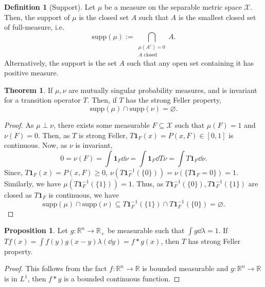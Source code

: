 \documentclass[]{article}
\theoremstyle{definition}
\newtheorem{theorem}{Theorem}
\theoremstyle{definition}
\newtheorem{definition}{Definition}[section]
\newtheorem{proposition}{Proposition}[section]
\begin{document}
\begin{definition}[Support]
  Let \(\mu\) be a measure on the separable metric space \(\mathcal{X}\). Then, 
  the support of \(\mu\) is the closed set \(A\) such that \(A\) is the smallest  
  closed set of full-measure, i.e. 
  \[\text{supp}(\mu) := \bigcap_{\substack{\mu(A^c) = 0\\A \text{ closed}}}A.\]
  Alternatively, the support is the set \(A\) such that any open set containing 
  it has positive measure. 
\end{definition}

\begin{theorem}
  If \(\mu, \nu\) are mutually singular probability measures, and is 
  invariant for a transition operator \(T\). Then, if \(T\) has the strong 
  Feller property, 
  \[\text{supp}(\mu) \cap \text{supp}(\nu) = \varnothing.\]
\end{theorem}
\begin{proof}
  As \(\mu \perp \nu\), there exists some measurable \(F \subseteq \mathcal{X}\) 
  such that \(\mu(F) = 1\) and \(\nu(F) = 0\). Then, as \(T\) is strong Feller, 
  \(T\mathbf{1}_{F}(x) = P(x, F) \in [0, 1]\) is continuous. Now, as \(\nu\) 
  is invariant, 
  \[0 = \nu(F) = \int \mathbf{1}_F \dd \nu = \int \mathbf{1}_F \dd T\nu = 
  \int T\mathbf{1}_F \dd \nu.\]
  Since, \(T\mathbf{1}_{F}(x) = P(x, F) \ge 0\), 
  \(\nu(T\mathbf{1}_F^{-1}(\{0\})) = \nu(\{T\mathbf{1}_F = 0\}) = 1\). Similarly, 
  we have \(\mu(T\mathbf{1}_F^{-1}(\{1\})) = 1\). Thus, as 
  \(T\mathbf{1}_F^{-1}(\{0\}), T\mathbf{1}_F^{-1}(\{1\})\) are closed as 
  \(T\mathbf{1}_F\) is continuous, we have 
  \[\text{supp}(\mu) \cap \text{supp}(\nu) \subseteq 
    T\mathbf{1}_F^{-1}(\{1\}) \cap T\mathbf{1}_F^{-1}(\{0\}) = \varnothing.\]
\end{proof}

\begin{proposition}
  Let \(g : \mathbb{R}^n \to \mathbb{R}_+\) be measurable such that 
  \(\int g \dd \lambda = 1\). If \(Tf(x) = \int f(y)g(x - y) \lambda(\dd y) = f * g(x)\),
  then \(T\) has strong Feller property.
\end{proposition}
\begin{proof}
  This follows from the fact \(f : \mathbb{R}^n \to \mathbb{R}\) is bounded measurable 
  and \(g : \mathbb{R}^n \to \mathbb{R}\) is in \(L^1\), then \(f * g\) is a bounded 
  continuous function. 
\end{proof}
\end{document}
